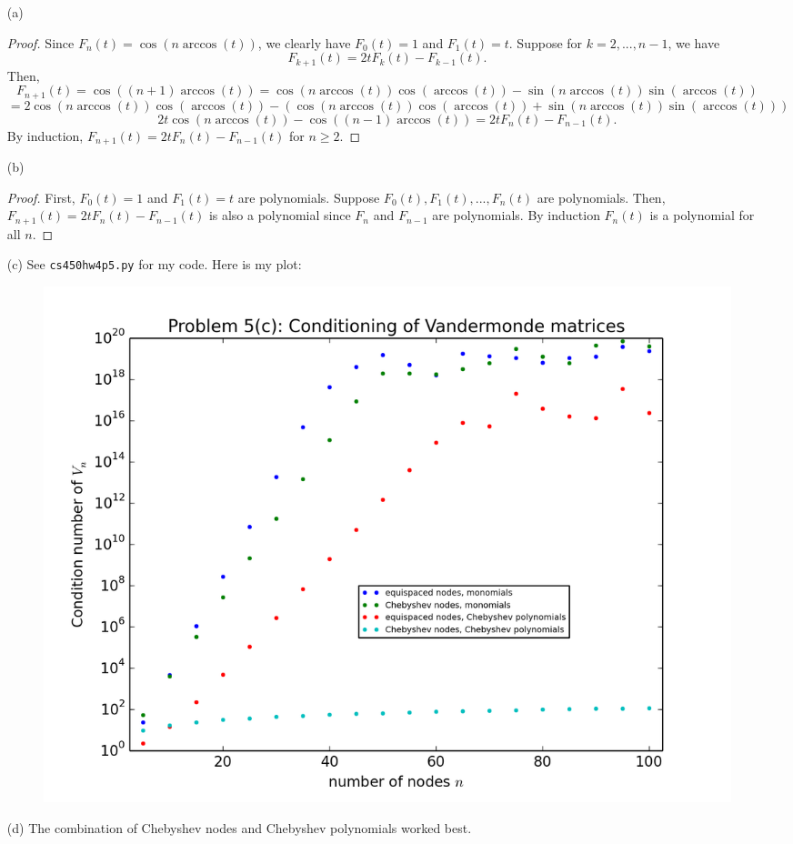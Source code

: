 \documentclass[10pt]{article}
\begin{document}
\begin{itemize}
\item[(a)] \begin{proof}
Since $ F_n(t) = \cos(n \arccos(t)) $, we clearly have $ F_0(t) = 1 $ and $ F_1(t) = t $. Suppose for $ k = 2, ... , n-1 $, we have $$
F_{k+1}(t) = 2 t F_k(t) - F_{k-1}(t).
$$ Then, $$
F_{n+1}(t) = \cos( (n+1) \arccos(t)) = \cos(n \arccos(t)) \cos(\arccos(t)) - \sin(n \arccos(t)) \sin(\arccos(t))
$$ $$
= 2 \cos(n \arccos(t)) \cos(\arccos(t)) - ( \cos(n \arccos(t)) \cos(\arccos(t))  + \sin(n \arccos(t)) \sin(\arccos(t)) )
$$ $$
2t \cos(n \arccos(t)) - \cos((n-1)\arccos(t)) = 2t F_{n}(t) - F_{n-1}(t).
$$ By induction, $ F_{n+1}(t) = 2 t F_n(t) - F_{n-1}(t) $ for $n \geq 2$.
\end{proof}

\item[(b)] \begin{proof} First, $ F_0(t) = 1 $ and $ F_1(t) = t $ are polynomials. Suppose $ F_0(t), F_1(t), ... , F_n(t) $ are polynomials. Then, $ F_{n+1}(t) = 2 t F_n(t) - F_{n-1}(t) $ is also a polynomial since $ F_n $ and $ F_{n-1} $ are polynomials. By induction $F_n(t)$ is a polynomial for all $n$. \end{proof}

\item[(c)] See \verb+cs450hw4p5.py+ for my code. Here is my plot:

\begin{figure}[H]
  \centering
    \includegraphics[scale=0.9]{p5}
\end{figure}

\item[(d)] The combination of Chebyshev nodes and Chebyshev polynomials worked best.

\end{itemize}
\end{document}
